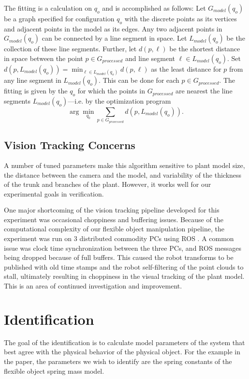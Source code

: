 \documentclass[runningheads,a4paper]{llncs}
\begin{document}
The fitting is a calculation on $q_o$ and is accomplished as follows: Let $G_{model}(q_o)$ be a graph specified for configuration $q_o$ with the discrete points as its vertices and adjacent points in the model as its edges. Any two adjacent points in $G_{model}(q_o)$ can be connected by a line segment in space. Let $L_{model}(q_o)$ be the collection of these line segments. Further, let $d(p,\ell)$ be the shortest distance in space between the point $p\in G_{processed}$ and line segment $\ell \in L_{model}(q_o)$. Set $d(p,L_{model}(q_o)) = \min_{\ell\in L_{model}(q_o)} d(p,\ell)$ as the least distance for $p$ from any line segment in $L_{model}(q_o)$. This can be done for each $p\in G_{processed}$. The fitting is given by the $q_o$ for which the points in $G_{processed}$ are nearest the line segments $L_{model}(q_o)$---i.e. by the optimization program
\begin{equation}
\arg \min_{q_0} \sum_{p\in G_{processed}} d(p,L_{model}(q_o)).
\label{eq-fit_prog}
\end{equation}

\subsection{Vision Tracking Concerns \label{sec-vis_disc}}

A number of tuned parameters make this algorithm sensitive to plant model size, the distance between the camera and the model, and variability of the thickness of the trunk and branches of the plant. However, it works well for our experimental goals in verification.

One major shortcoming of the vision tracking pipeline developed for this experiment was occasional choppiness and buffering issues. Because of the computational complexity of our flexible object manipulation pipeline, the experiment was run on 3 distributed commodity PCs using ROS \cite{quigley2009ros}. A common issue was clock time synchronization between the three PCs, and ROS messages being dropped because of full buffers. This caused the robot transforms to be published with old time stamps and the robot self-filtering of the point clouds to stall, ultimately resulting in choppiness in the visual tracking of the plant model. This is an area of continued investigation and improvement. 

\section{Identification}
\label{sec-id}
The goal of the identification is to calculate model parameters of the system that best agree with the physical behavior of the physical object. For the example in the paper, the parameters we wish to identify are the spring constants of the flexible object spring mass model. 
\end{document}
